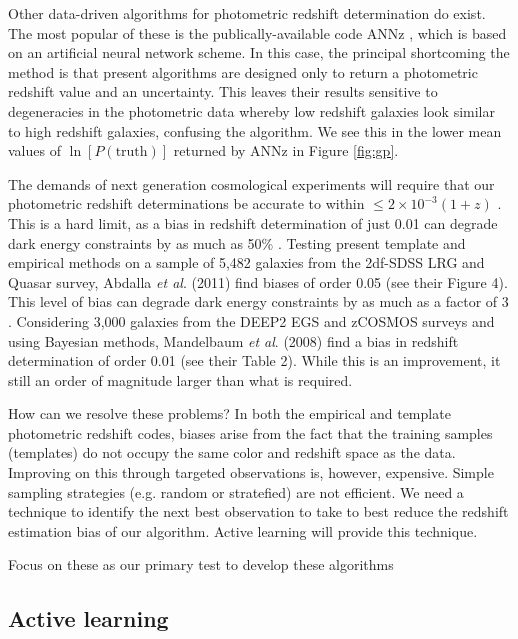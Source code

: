 \documentclass[useAMS,usenatbib,tightenlines,11pt,preprint]{aastex}
\begin{document}
Other data-driven algorithms for photometric redshift determination do exist. 
The most popular of these is the publically-available code ANNz \cite{annz},
which is based on an artificial neural network scheme.
In this case, the principal
shortcoming the method is that present algorithms are designed only to return a
photometric redshift value and an uncertainty.  This leaves their results
sensitive to degeneracies in the photometric data whereby low redshift galaxies
look similar to high redshift galaxies, confusing the algorithm. 
We see this in the lower mean values of $\ln[P(\text{truth})]$ returned by ANNz
in Figure \ref{fig:gp}.

The demands of next generation cosmological experiments will require
that our photometric redshift determinations be accurate to within
$\le 2\times 10^{-3}(1+z)$ \cite{desc}.  This is a hard limit, as a
bias in redshift determination of just 0.01 can degrade dark energy
constraints by as much as 50\%
\cite{kitching,huterer2006,nakajima2011}.  Testing present template
and empirical methods on a sample of 5,482 galaxies from the 2df-SDSS
LRG and Quasar survey, Abdalla {\it et al}. (2011) find biases of
order 0.05 (see their Figure 4).  This level of bias can degrade dark
energy constraints by as much as a factor of 3 \cite{Ma2006}.
Considering 3,000 galaxies from the DEEP2 EGS and zCOSMOS surveys and
using Bayesian methods, Mandelbaum {\it et al}.  (2008) find a bias in
redshift determination of order 0.01 (see their Table 2).  While this
is an improvement, it still an order of magnitude larger than what is
required.


How can we resolve these problems?  In both the empirical and template
photometric redshift codes, biases arise from the fact that the
training samples (templates) do not occupy the same color and redshift
space as the data.  Improving on this through targeted observations
is, however, expensive.  Simple sampling strategies (e.g. random or
stratefied) are not efficient.  We need a technique to identify the
next best observation to take to best reduce the redshift estimation
bias of our algorithm.  Active learning will provide this technique.

Focus on these as our primary test to develop these algorithms

\subsection{Active learning}
\end{document}

